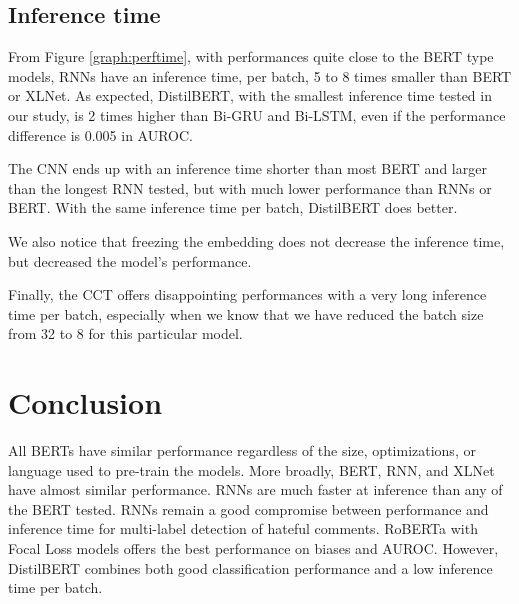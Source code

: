\documentclass[a4paper,english]{rnti}
\begin{document}
\subsection{Inference time}

From Figure \ref{graph:perftime}, with performances quite close to the BERT type models, RNNs have an inference time, per batch, 5 to 8 times smaller than BERT or XLNet. As expected, DistilBERT, with the smallest inference time tested in our study, is 2 times higher than Bi-GRU and Bi-LSTM, even if the performance difference is 0.005 in AUROC.

The CNN ends up with an inference time shorter than most BERT and larger than the longest RNN tested, but with much lower performance than RNNs or BERT. With the same inference time per batch, DistilBERT does better.

We also notice that freezing the embedding does not decrease the inference time, but decreased the model's performance.

Finally, the CCT offers disappointing performances with a very long inference time per batch, especially when we know that we have reduced the batch size from 32 to 8 for this particular model.

\section{Conclusion}
\label{sec:conclusion}

All BERTs have similar performance regardless of the size, optimizations, or language used to pre-train the models. More broadly, BERT, RNN, and XLNet have almost similar performance. RNNs are much faster at inference than any of the BERT tested. RNNs remain a good compromise between performance and inference time for multi-label detection of hateful comments. RoBERTa with Focal Loss models offers the best performance on biases and AUROC. However, DistilBERT combines both good classification performance and a low inference time per batch. 
\end{document}
